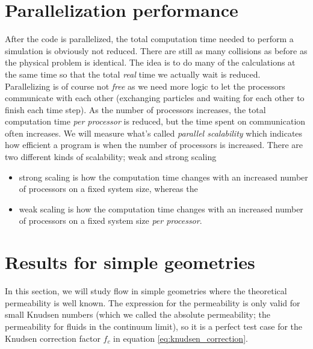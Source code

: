 \section{Parallelization performance}
\label{sec:dsmc_parallelization_performance}
After the code is parallelized, the total computation time needed to perform a simulation is obviously not reduced. There are still as many collisions as before as the physical problem is identical. The idea is to do many of the calculations at the same time so that the total \textit{real} time we actually wait is reduced. Parallelizing is of course not \textit{free} as we need more logic to let the processors communicate with each other (exchanging particles and waiting for each other to finish each time step). As the number of processors increases, the total computation time \textit{per processor} is reduced, but the time spent on communication often increases. We will measure what's called \textit{parallel scalability} which indicates how efficient a program is when the number of processors is increased. There are two different kinds of scalability; weak and strong scaling
\begin{itemize}
	\item strong scaling is how the computation time changes with an increased number of processors on a fixed system size, whereas the
	\item weak scaling is how the computation time changes with an increased number of processors on a fixed system size \textit{per processor}.
\end{itemize}


\section{Results for simple geometries}
\label{sec:results_for_simple_geometries}
In this section, we will study flow in simple geometries where the theoretical permeability is well known. The expression for the permeability is only valid for small Knudsen numbers (which we called the absolute permeability; the permeability for fluids in the continuum limit), so it is a perfect test case for the Knudsen correction factor $f_c$ in equation \eqref{eq:knudsen_correction}. 

